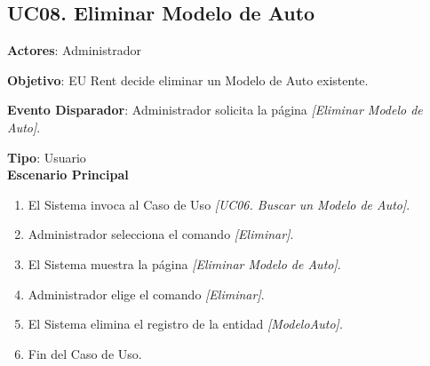 \subsection{UC08. Eliminar Modelo de Auto} \label{EliminarModeloAuto}
\textbf{Actores}: Administrador

\textbf{Objetivo}: EU Rent decide eliminar un Modelo de Auto existente.

\textbf{Evento Disparador}: Administrador solicita la página \textit{[Eliminar Modelo de Auto]}.

\textbf{Tipo}: Usuario\\

\textbf{Escenario Principal}

\begin{enumerate}
\item El Sistema invoca al Caso de Uso \textit{[UC06. Buscar un Modelo de Auto]}.
\item Administrador selecciona el comando \textit{[Eliminar]}.
\item El Sistema muestra la página \textit{[Eliminar Modelo de Auto]}.
\item Administrador elige el comando \textit{[Eliminar]}.
\item El Sistema elimina el registro de la entidad \textit{[ModeloAuto]}.
\item Fin del Caso de Uso.
\end{enumerate}
